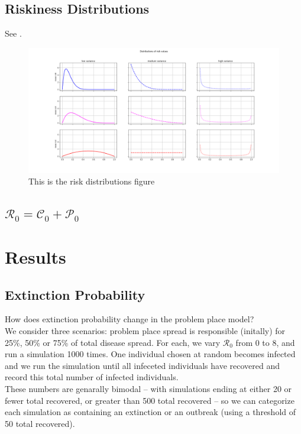 \documentclass{article}
\begin{document}
\subsection{Riskiness Distributions}

See .


\begin{figure}
\centering
\includegraphics[width=\textwidth]{risk_distributions}
\caption{This is the risk distributions figure}
\label{fig:risk_distributions}
\end{figure}

\subsection{$\mathcal{R}_0 = \mathcal{C}_0 + \mathcal{P}_0$}


\section{Results}
\subsection{Extinction Probability}


How does extinction probability change in the problem place model?\\

We consider three scenarios: problem place spread is responsible (initally)
for 25\%, 50\% or 75\% of total disease spread. For each, we vary $\mathcal{R}_0$
from 0 to 8, and run a simulation 1000 times. One individual chosen
at random becomes infected and we run the simulation until all infeceted
individuals have recovered and record this total number of infected individuals.\\

These numbers are genarally bimodal – with simulations
ending at either 20 or fewer total recovered, or greater than 500 total
recovered – so we can categorize each simulation as containing an extinction
or an outbreak (using a threshold of 50 total recovered).\\
\end{document}
